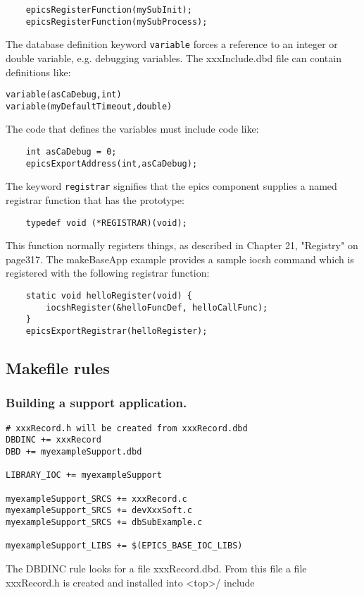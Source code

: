 \begin{verbatim}    epicsRegisterFunction(mySubInit);
    epicsRegisterFunction(mySubProcess);
\end{verbatim}The database definition keyword \verb|variable| forces a reference to an integer or double variable, e.g. debugging variables. 
The xxxInclude.dbd file can contain definitions like:

\begin{verbatim}variable(asCaDebug,int)
variable(myDefaultTimeout,double)
\end{verbatim}The code that defines the variables must include code like:

\begin{verbatim}    int asCaDebug = 0;
    epicsExportAddress(int,asCaDebug);
\end{verbatim}The keyword \verb|registrar| signifies that the epics component supplies a named registrar function that has the prototype:

\begin{verbatim}    typedef void (*REGISTRAR)(void);
\end{verbatim}This function normally registers things, as described in Chapter 21, "Registry" on page317. The makeBaseApp example 
provides a sample iocsh command which is registered with the following registrar function:

\begin{verbatim}    static void helloRegister(void) {
        iocshRegister(&helloFuncDef, helloCallFunc);
    }
    epicsExportRegistrar(helloRegister);
\end{verbatim}
\subsection{Makefile rules}

\subsubsection{Building a support application.}

\begin{verbatim}# xxxRecord.h will be created from xxxRecord.dbd
DBDINC += xxxRecord
DBD += myexampleSupport.dbd

LIBRARY_IOC += myexampleSupport

myexampleSupport_SRCS += xxxRecord.c
myexampleSupport_SRCS += devXxxSoft.c
myexampleSupport_SRCS += dbSubExample.c

myexampleSupport_LIBS += $(EPICS_BASE_IOC_LIBS)
\end{verbatim}The DBDINC rule looks for a file xxxRecord.dbd. From this file a file xxxRecord.h is created and installed into \textless{}top\textgreater{}/
include

